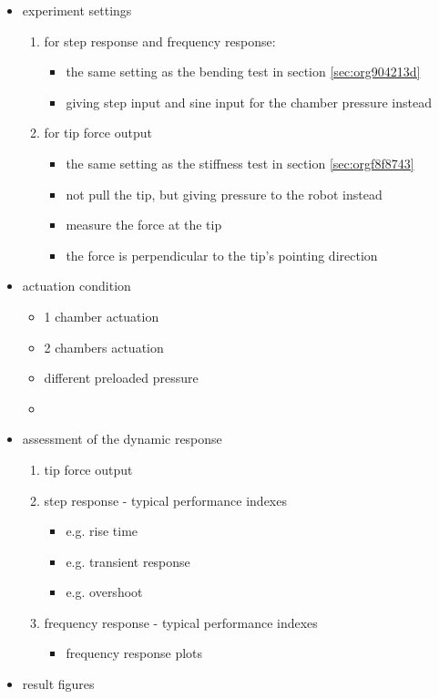 \documentclass[journal,onecolumn]{IEEEtran}
\begin{document}
\begin{itemize}
\item experiment settings
\begin{enumerate}
\item for step response and frequency response:
\begin{itemize}
\item the same setting as the bending test in section \ref{sec:org904213d}
\item giving step input and sine input for the chamber pressure instead
\end{itemize}
\item for tip force output
\begin{itemize}
\item the same setting as the stiffness test in section \ref{sec:orgf8f8743}
\item not pull the tip, but giving pressure to the robot instead
\item measure the force at the tip
\item the force is perpendicular to the tip's pointing direction
\end{itemize}
\end{enumerate}
\item actuation condition
\begin{itemize}
\item 1 chamber actuation
\item 2 chambers actuation
\item different preloaded pressure
\item 
\end{itemize}
\item assessment of the dynamic response
\begin{enumerate}
\item tip force output
\item step response - typical performance indexes
\begin{itemize}
\item e.g. rise time
\item e.g. transient response
\item e.g. overshoot
\end{itemize}
\item frequency response - typical performance indexes
\begin{itemize}
\item frequency response plots
\end{itemize}
\end{enumerate}
\item result figures

\end{itemize}
\end{document}
